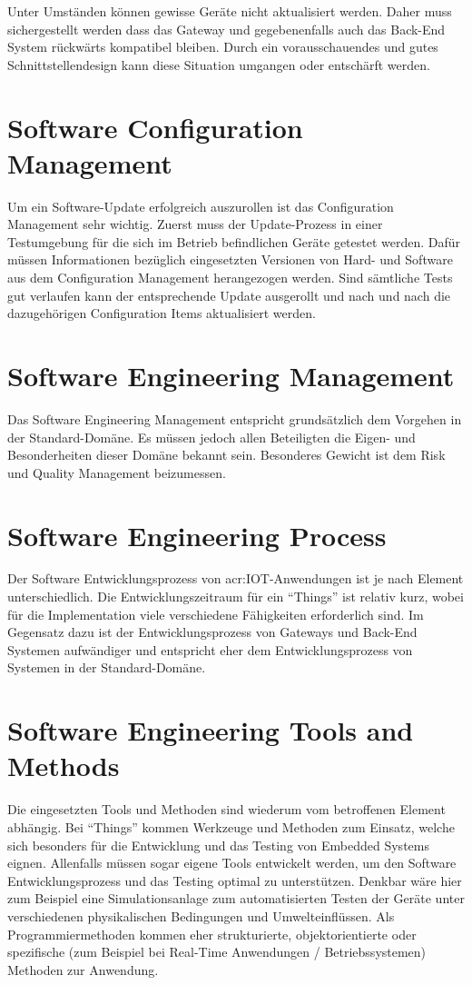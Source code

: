 Unter Umständen können gewisse Geräte nicht aktualisiert werden. Daher muss sichergestellt werden dass das Gateway und gegebenenfalls auch das Back-End System rückwärts kompatibel bleiben. Durch ein vorausschauendes und gutes Schnittstellendesign kann diese Situation umgangen oder entschärft werden.



\section{Software Configuration Management}
Um ein Software-Update erfolgreich auszurollen ist das Configuration Management sehr wichtig. Zuerst muss der Update-Prozess in einer Testumgebung für die sich im Betrieb befindlichen Geräte getestet werden. Dafür müssen Informationen bezüglich eingesetzten Versionen von Hard- und Software aus dem Configuration Management herangezogen werden. Sind sämtliche Tests gut verlaufen kann der entsprechende Update ausgerollt und nach und nach die dazugehörigen Configuration Items aktualisiert werden.



\section{Software Engineering Management}
Das Software Engineering Management entspricht grundsätzlich dem Vorgehen in der Standard-Domäne. Es müssen jedoch allen Beteiligten die Eigen- und Besonderheiten dieser Domäne bekannt sein. Besonderes Gewicht ist dem Risk und Quality Management beizumessen.



\section{Software Engineering Process}
Der Software Entwicklungsprozess von \gls{acr:IOT}-Anwendungen ist je nach Element unterschiedlich. Die Entwicklungszeitraum für ein "`Things"' ist relativ kurz, wobei für die Implementation viele verschiedene Fähigkeiten erforderlich sind. Im Gegensatz dazu ist der Entwicklungsprozess von Gateways und Back-End Systemen aufwändiger und entspricht eher dem Entwicklungsprozess von Systemen in der Standard-Domäne.



\section{Software Engineering Tools and Methods}
Die eingesetzten Tools und Methoden sind wiederum vom betroffenen Element abhängig. Bei "`Things"' kommen Werkzeuge und Methoden zum Einsatz, welche sich besonders für die Entwicklung und das Testing von Embedded Systems eignen. Allenfalls müssen sogar eigene Tools entwickelt werden, um den Software Entwicklungsprozess und das Testing optimal zu unterstützen. Denkbar wäre hier zum Beispiel eine Simulationsanlage zum automatisierten Testen der Geräte unter verschiedenen physikalischen Bedingungen und Umwelteinflüssen. Als Programmiermethoden kommen eher strukturierte, objektorientierte oder spezifische (zum Beispiel bei Real-Time Anwendungen / Betriebssystemen) Methoden zur Anwendung.

